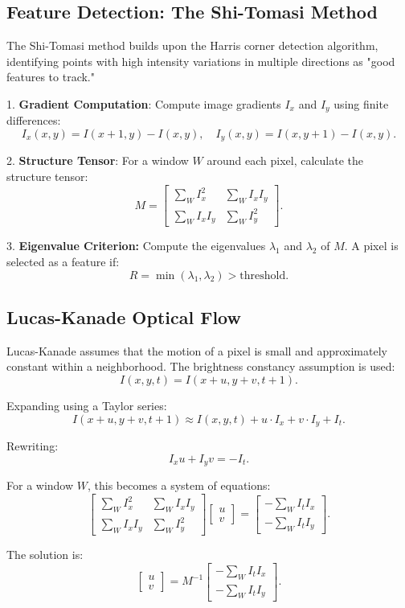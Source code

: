 \documentclass[10pt, conference, letterpaper]{IEEEtran}
\begin{document}
\subsection{Feature Detection: The Shi-Tomasi Method}
The Shi-Tomasi method builds upon the Harris corner detection algorithm, identifying points with high intensity variations in multiple directions as "good features to track."

1. \textbf{Gradient Computation}: Compute image gradients \( I_x \) and \( I_y \) using finite differences:
\[
I_x(x, y) = I(x+1, y) - I(x, y), \quad I_y(x, y) = I(x, y+1) - I(x, y).
\]

2. \textbf{Structure Tensor}: For a window \( W \) around each pixel, calculate the structure tensor:
\[
M = \begin{bmatrix}
\sum_W I_x^2 & \sum_W I_x I_y \\
\sum_W I_x I_y & \sum_W I_y^2
\end{bmatrix}.
\]

3. \textbf{Eigenvalue Criterion:} Compute the eigenvalues \( \lambda_1 \) and \( \lambda_2 \) of \( M \). A pixel is selected as a feature if:
\[
R = \min(\lambda_1, \lambda_2) > \text{threshold}.
\]

\subsection{Lucas-Kanade Optical Flow}
Lucas-Kanade assumes that the motion of a pixel is small and approximately constant within a neighborhood. The brightness constancy assumption is used:
\[
I(x, y, t) = I(x+u, y+v, t+1).
\]

Expanding using a Taylor series:
\[
I(x+u, y+v, t+1) \approx I(x, y, t) + u \cdot I_x + v \cdot I_y + I_t.
\]

Rewriting:
\[
I_x u + I_y v = -I_t.
\]

For a window \( W \), this becomes a system of equations:
\[
\begin{bmatrix}
\sum_W I_x^2 & \sum_W I_x I_y \\
\sum_W I_x I_y & \sum_W I_y^2
\end{bmatrix}
\begin{bmatrix}
u \\ v
\end{bmatrix}
=
\begin{bmatrix}
-\sum_W I_t I_x \\
-\sum_W I_t I_y
\end{bmatrix}.
\]

The solution is:
\[
\begin{bmatrix}
u \\ v
\end{bmatrix}
=
M^{-1}
\begin{bmatrix}
-\sum_W I_t I_x \\
-\sum_W I_t I_y
\end{bmatrix}.
\]
\end{document}
